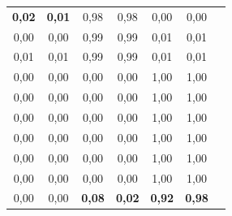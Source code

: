 \documentclass{VUMIFPSbakalaurinis}
\begin{document}
\begin{table}[]
{\begin{tabular}{|cc|cc|cc|l}
        \multicolumn{1}{|c|}{\textbf{0,02}}       & \textbf{0,01}        & \multicolumn{1}{c|}{0,98}                & 0,98                 & \multicolumn{1}{c|}{0,00}                & 0,00                 &  \\ \cline{1-6}
        \multicolumn{1}{|c|}{0,00}                & 0,00                 & \multicolumn{1}{c|}{0,99}                & 0,99                 & \multicolumn{1}{c|}{0,01}                & 0,01                 &  \\ \cline{1-6}
        \multicolumn{1}{|c|}{0,01}                & 0,01                 & \multicolumn{1}{c|}{0,99}                & 0,99                 & \multicolumn{1}{c|}{0,01}                & 0,01                 &  \\ \cline{1-6}
        \multicolumn{1}{|c|}{0,00}                & 0,00                 & \multicolumn{1}{c|}{0,00}                & 0,00                 & \multicolumn{1}{c|}{1,00}                & 1,00                 &  \\ \cline{1-6}
        \multicolumn{1}{|c|}{0,00}                & 0,00                 & \multicolumn{1}{c|}{0,00}                & 0,00                 & \multicolumn{1}{c|}{1,00}                & 1,00                 &  \\ \cline{1-6}
        \multicolumn{1}{|c|}{0,00}                & 0,00                 & \multicolumn{1}{c|}{0,00}                & 0,00                 & \multicolumn{1}{c|}{1,00}                & 1,00                 &  \\ \cline{1-6}
        \multicolumn{1}{|c|}{0,00}                & 0,00                 & \multicolumn{1}{c|}{0,00}                & 0,00                 & \multicolumn{1}{c|}{1,00}                & 1,00                 &  \\ \cline{1-6}
        \multicolumn{1}{|c|}{0,00}                & 0,00                 & \multicolumn{1}{c|}{0,00}                & 0,00                 & \multicolumn{1}{c|}{1,00}                & 1,00                 &  \\ \cline{1-6}
        \multicolumn{1}{|c|}{0,00}                & 0,00                 & \multicolumn{1}{c|}{0,00}                & 0,00                 & \multicolumn{1}{c|}{1,00}                & 1,00                 &  \\ \cline{1-6}
        \multicolumn{1}{|c|}{0,00}                & 0,00                 & \multicolumn{1}{c|}{\textbf{0,08}}       & \textbf{0,02}        & \multicolumn{1}{c|}{\textbf{0,92}}       & \textbf{0,98}        &  \\ \cline{1-6}

\end{tabular}}
\end{table}
\end{document}
